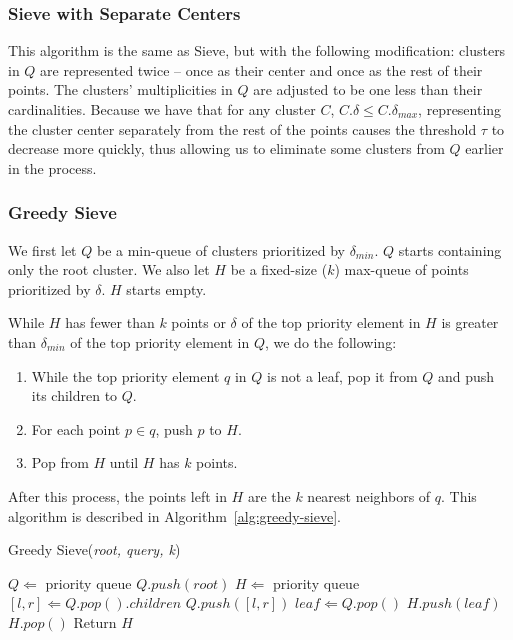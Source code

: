 \subsubsection{Sieve with Separate Centers}
\label{subsubsec:methods:knn-search:sieve2}

This algorithm is the same as Sieve, but with the following modification:
clusters in $Q$ are represented twice -- once as their center and once as the rest of their points.
The clusters' multiplicities in $Q$ are adjusted to be one less than their cardinalities.
Because we have that for any cluster $C$, $C.\delta \leq C.\delta_{max}$, representing the cluster center separately from the rest of the points causes the threshold $\tau$ to decrease more quickly, thus allowing us to eliminate some clusters from $Q$ earlier in the process. 


\subsubsection{Greedy Sieve}
\label{subsubsec:methods:knn-search:greedy-search}

We first let $Q$ be a min-queue of clusters prioritized by $\delta_{min}$.
$Q$ starts containing only the root cluster.
We also let $H$ be a fixed-size ($k$) max-queue of points prioritized by $\delta$.
$H$ starts empty.

While $H$ has fewer than $k$ points or $\delta$ of the top priority element in $H$ is greater than $\delta_{min}$ of the top priority element in $Q$, we do the following:

\begin{enumerate}
\item While the top priority element $q$ in $Q$ is not a leaf, pop it from $Q$ and push its children to $Q$.
\item For each point $p \in q$, push $p$ to $H$. 
\item Pop from $H$ until $H$ has $k$ points. 
\end{enumerate}

After this process, the points left in $H$ are the $k$ nearest neighbors of $q$.
This algorithm is described in Algorithm~\ref{alg:greedy-sieve}.

\begin{algorithm} 
\caption{Greedy Sieve(\emph{root, query, k})} 
\label{alg:greedy-sieve} 
\begin{algorithmic}
    \STATE $Q \Leftarrow$ priority queue
    \STATE $Q.push(root)$
    \STATE $H \Leftarrow$ priority queue
            \STATE $[l, r] \Leftarrow Q.pop().children$
            \STATE $Q.push([l, r])$
        \ENDWHILE
        \STATE $leaf \Leftarrow Q.pop()$
        \STATE $H.push(leaf)$
            \STATE $H.pop()$
        \ENDWHILE
    \ENDWHILE
    \STATE Return $H$
\end{algorithmic}
\end{algorithm}


